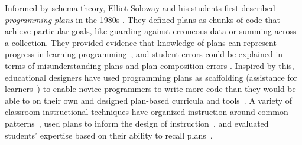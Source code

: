 Informed by schema theory, Elliot Soloway and his students first described \emph{programming plans} in the 1980s \cite{soloway1980problems,soloway-yale-studies,soloway1985problems}. They defined plans as chunks of code that achieve particular goals, like guarding against erroneous data or summing across a collection. 
They provided evidence that knowledge of plans can represent progress in learning programming~\cite{soloway1986learning}, and student errors could be explained in terms of misunderstanding plans \cite{looping,highfreq} and plan composition errors \cite{putalltogether}. 
Inspired by this, educational designers have used programming plans as scaffolding (assistance for learners~\cite{wood1976role}) to enable novice programmers to write more code than they would be able to on their own and designed plan-based curricula and tools~\cite{gpceditor, hohmann1992soda}. 
A variety of classroom instructional techniques have organized instruction around common patterns~\cite{clancy_designing_1996, muller_pattern-oriented_2007, muller_supporting_2008}, used plans to inform the design of instruction~\cite{Duran_ProgramComplexity_ICER-2018}, and evaluated students' expertise based on their ability to recall plans~\cite{arto_ava_reviewer}.

